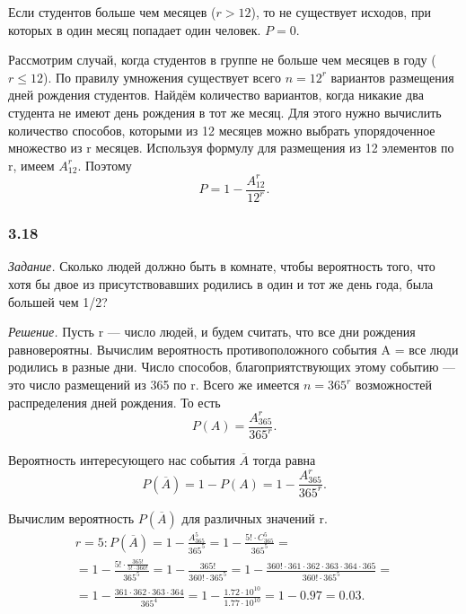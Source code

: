 \documentclass{book}
\begin{document}
Если студентов больше чем месяцев ($ r > 12 $), то не существует исходов, при которых в один месяц попадает один человек.
$ P = 0 $.

Рассмотрим случай, когда студентов в группе не больше чем месяцев в году ($ r \leq 12 $).
По правилу умножения существует всего $ n = 12^r $ вариантов размещения дней рождения студентов.
Найдём количество вариантов, когда никакие два студента не имеют день рождения в тот же месяц.
Для этого нужно вычислить количество способов, которыми из 12 месяцев можно выбрать упорядоченное множество из r месяцев.
Используя формулу для размещения из 12 элементов по r, имеем $ A_{12}^r $.
Поэтому
$$ P =
1 - \frac{ A_{ 12 }^r }{ 12^r }.$$

\subsubsection*{3.18}

\textit{Задание.} Сколько людей должно быть в комнате, чтобы вероятность того, что хотя бы двое из присутствовавших родились в один и тот же день года, была большей чем 1/2?

\textit{Решение.} Пусть r --- число людей, и будем считать, что все дни рождения равновероятны.
Вычислим вероятность противоположного события A = {все люди родились в разные дни}.
Число способов, благоприятствующих этому событию --- это число размещений из 365 по r.
Всего же имеется $ n = 365^r $ возможностей распределения дней рождения.
То есть
$$ P(A) =
\frac{A_{365}^r}{365^r}.$$

Вероятность интересующего нас события $ \overline{A} $ тогда равна
$$ P \left( \overline{A} \right) =
1 - P \left( A \right) =
1 - \frac{A_{365}^r}{365^r}.$$

Вычислим вероятность $ P \left( \overline{A} \right) $ для различных значений r.
\begin{equation*}
\begin{split}
r = 5 : P \left( \overline{A} \right) =
1 - \frac{A_{365}^5}{365^5} =
1 - \frac{5! \cdot C_{365}^5}{365^5} = \\
= 1 - \frac{5! \cdot \frac{365!}{5! \cdot 360!} }{365^5} =
1 - \frac{365!}{360! \cdot 365^5} =
1 - \frac{360! \cdot 361 \cdot 362 \cdot 363 \cdot 364 \cdot 365}{360! \cdot 365^5} = \\
= 1 - \frac{361 \cdot 362 \cdot 363 \cdot 364}{365^4} =
1 - \frac{1.72 \cdot 10^10}{1.77 \cdot 10^10} =
1 - 0.97 =
0.03.
\end{split}
\end{equation*}
\end{document}
